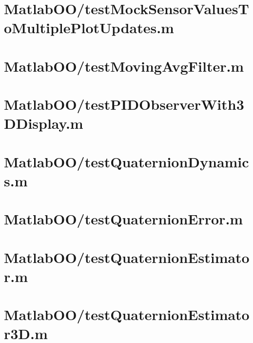 \pagebreak
\section{MatlabOO/testMockSensorValuesToMultiplePlotUpdates.m}\label{code:MatlabOO/testMockSensorValuesToMultiplePlotUpdates.m}


\pagebreak
\section{MatlabOO/testMovingAvgFilter.m}\label{code:MatlabOO/testMovingAvgFilter.m}


\pagebreak
\section{MatlabOO/testPIDObserverWith3DDisplay.m}\label{code:MatlabOO/testPIDObserverWith3DDisplay.m}


\pagebreak
\section{MatlabOO/testQuaternionDynamics.m}\label{code:MatlabOO/testQuaternionDynamics.m}


\pagebreak
\section{MatlabOO/testQuaternionError.m}\label{code:MatlabOO/testQuaternionError.m}


\pagebreak
\section{MatlabOO/testQuaternionEstimator.m}\label{code:MatlabOO/testQuaternionEstimator.m}


\pagebreak
\section{MatlabOO/testQuaternionEstimator3D.m}\label{code:MatlabOO/testQuaternionEstimator3D.m}


